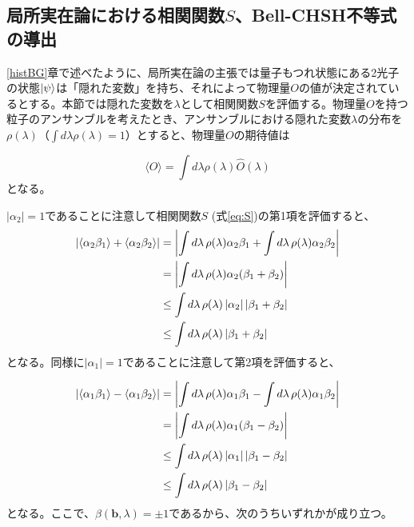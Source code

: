 \documentclass[../../main.tex]{subfiles}
\numberwithin{equation}{section}
\numberwithin{table}{section}
\numberwithin{figure}{section}
\begin{document}
\subsection{局所実在論における相関関数$S$、Bell-CHSH不等式の導出}

\ref{histBG}章で述べたように、局所実在論の主張では量子もつれ状態にある2光子の状態$\ket{\psi}$は「隠れた変数」を持ち、それによって物理量$O$の値が決定されているとする。本節では隠れた変数を$\lambda$として相関関数$S$を評価する。物理量$O$を持つ粒子のアンサンブルを考えたとき、アンサンブルにおける隠れた変数$\lambda$の分布を$\rho(\lambda)$（$\int d\lambda \rho(\lambda) =1 $）とすると、物理量$O$の期待値は

\begin{equation}
	 \langle O \rangle = \int d\lambda \rho(\lambda)\hat{O}(\lambda)
\end{equation}
となる。

$\lvert \alpha_2 \rvert=1$であることに注意して相関関数$S$ (式\eqref{eq:S})の第1項を評価すると、
\begin{align}
	\left\lvert \langle \alpha_2\beta_1 \rangle + \langle \alpha_2\beta_2 \rangle \right\rvert
	&= \left\lvert \int d\lambda \, \rho(\lambda) \alpha_2\beta_1 + \int d\lambda \, \rho(\lambda) \alpha_2\beta_2 \right\rvert \notag \\
	&= \left\lvert \int d\lambda \, \rho(\lambda) \alpha_2(\beta_1+\beta_2) \right\rvert \notag \\
	&\leq \int d\lambda \, \rho(\lambda) \left\lvert \alpha_2 \right\rvert \left\lvert \beta_1+\beta_2 \right\rvert \notag \\
	&\leq \int d\lambda \, \rho(\lambda)  \left\lvert \beta_1+\beta_2 \right\rvert \label{eq:S+}
\end{align}
となる。同様に$\lvert \alpha_1 \rvert=1$であることに注意して第2項を評価すると、

\begin{align}
	\left\lvert \langle \alpha_1\beta_1 \rangle - \langle \alpha_1\beta_2 \rangle \right\rvert
	&= \left\lvert \int d\lambda \, \rho(\lambda) \alpha_1\beta_1 - \int d\lambda \, \rho(\lambda) \alpha_1\beta_2 \right\rvert \notag \\
	&= \left\lvert \int d\lambda \, \rho(\lambda) \alpha_1(\beta_1-\beta_2) \right\rvert \notag \\
	&\leq \int d\lambda \, \rho(\lambda) \left\lvert \alpha_1 \right\rvert \left\lvert \beta_1-\beta_2 \right\rvert \notag \\
	&\leq \int d\lambda \, \rho(\lambda)  \left\lvert \beta_1-\beta_2 \right\rvert \label{eq:S-}
\end{align}
となる。ここで、$\beta(\mathbf{b},\lambda)=\pm1$であるから、次のうちいずれかが成り立つ。
\end{document}
